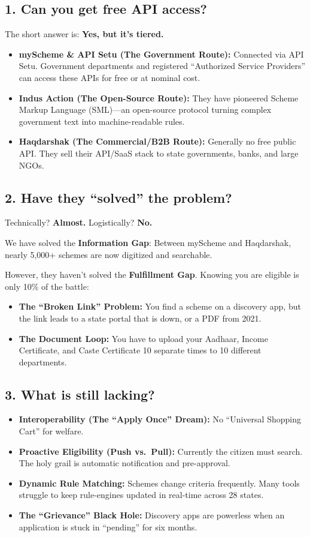 \documentclass[11pt,a4paper]{article}
\begin{document}
\subsection*{1. Can you get free API access?}
The short answer is: \textbf{Yes, but it's tiered.}

\begin{itemize}[nosep]
\item \textbf{myScheme \& API Setu (The Government Route):} Connected via API Setu. Government departments and registered ``Authorized Service Providers'' can access these APIs for free or at nominal cost.
\item \textbf{Indus Action (The Open-Source Route):} They have pioneered Scheme Markup Language (SML)---an open-source protocol turning complex government text into machine-readable rules.
\item \textbf{Haqdarshak (The Commercial/B2B Route):} Generally no free public API. They sell their API/SaaS stack to state governments, banks, and large NGOs.
\end{itemize}

\subsection*{2. Have they ``solved'' the problem?}
Technically? \textbf{Almost.} Logistically? \textbf{No.}

We have solved the \textbf{Information Gap}: Between myScheme and Haqdarshak, nearly 5,000+ schemes are now digitized and searchable.

However, they haven't solved the \textbf{Fulfillment Gap}. Knowing you are eligible is only 10\% of the battle:
\begin{itemize}[nosep]
\item \textbf{The ``Broken Link'' Problem:} You find a scheme on a discovery app, but the link leads to a state portal that is down, or a PDF from 2021.
\item \textbf{The Document Loop:} You have to upload your Aadhaar, Income Certificate, and Caste Certificate 10 separate times to 10 different departments.
\end{itemize}

\subsection*{3. What is still lacking?}
\begin{itemize}[nosep]
\item \textbf{Interoperability (The ``Apply Once'' Dream):} No ``Universal Shopping Cart'' for welfare.
\item \textbf{Proactive Eligibility (Push vs.\ Pull):} Currently the citizen must search. The holy grail is automatic notification and pre-approval.
\item \textbf{Dynamic Rule Matching:} Schemes change criteria frequently. Many tools struggle to keep rule-engines updated in real-time across 28 states.
\item \textbf{The ``Grievance'' Black Hole:} Discovery apps are powerless when an application is stuck in ``pending'' for six months.
\end{itemize}
\end{document}
